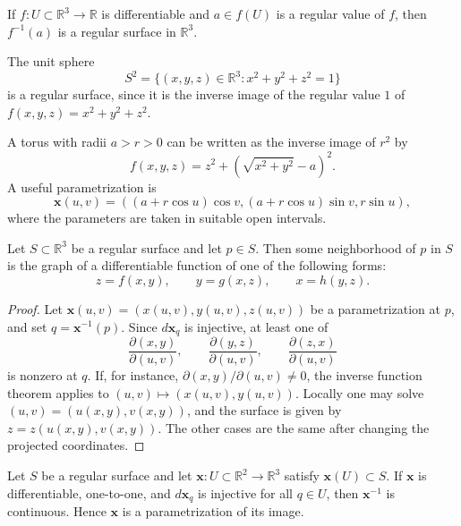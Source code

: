\documentclass[12pt, oneside]{book}
\begin{document}
\begin{proposition}
    If $f:U\subset \mathbb{R}^3\rightarrow \mathbb{R}$ is differentiable and
    $a\in f(U)$ is a regular value of $f$, then $f^{-1}(a)$ is a regular
    surface in $\mathbb{R}^3$.
\end{proposition}

\begin{example}
    The unit sphere
    \[
        S^2=\{(x,y,z)\in \mathbb{R}^3:x^2+y^2+z^2=1\}
    \]
    is a regular surface, since it is the inverse image of the regular value
    $1$ of $f(x,y,z)=x^2+y^2+z^2$.
\end{example}

\begin{example}
    A torus with radii $a>r>0$ can be written as the inverse image of $r^2$
    by
    \[
        f(x,y,z)=z^2+\left(\sqrt{x^2+y^2}-a\right)^2 .
    \]
    A useful parametrization is
    \[
        \mathbf{x}(u,v)=((a+r\cos u)\cos v,(a+r\cos u)\sin v,r\sin u),
    \]
    where the parameters are taken in suitable open intervals.
\end{example}

\begin{proposition}
    Let $S\subset \mathbb{R}^3$ be a regular surface and let $p\in S$.  Then
    some neighborhood of $p$ in $S$ is the graph of a differentiable function
    of one of the following forms:
    \[
        z=f(x,y),\qquad y=g(x,z),\qquad x=h(y,z).
    \]
\end{proposition}

\begin{proof}
    Let $\mathbf{x}(u,v)=(x(u,v),y(u,v),z(u,v))$ be a parametrization at
    $p$, and set $q=\mathbf{x}^{-1}(p)$.  Since $d\mathbf{x}_q$ is injective,
    at least one of
    \[
        \frac{\partial(x,y)}{\partial(u,v)},\qquad
        \frac{\partial(y,z)}{\partial(u,v)},\qquad
        \frac{\partial(z,x)}{\partial(u,v)}
    \]
    is nonzero at $q$.  If, for instance,
    $\partial(x,y)/\partial(u,v)\neq 0$, the inverse function theorem applies
    to $(u,v)\mapsto (x(u,v),y(u,v))$.  Locally one may solve
    $(u,v)=(u(x,y),v(x,y))$, and the surface is given by
    $z=z(u(x,y),v(x,y))$.  The other cases are the same after changing the
    projected coordinates.
\end{proof}

\begin{proposition}
    Let $S$ be a regular surface and let
    $\mathbf{x}:U\subset \mathbb{R}^2\rightarrow \mathbb{R}^3$ satisfy
    $\mathbf{x}(U)\subset S$.  If $\mathbf{x}$ is differentiable, one-to-one,
    and $d\mathbf{x}_q$ is injective for all $q\in U$, then
    $\mathbf{x}^{-1}$ is continuous.  Hence $\mathbf{x}$ is a parametrization
    of its image.
\end{proposition}
\end{document}
